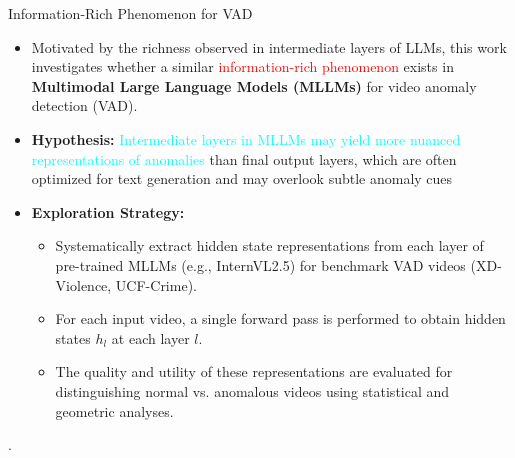 \documentclass[aspectratio=169,xcolor=dvipsnames]{beamer}
\begin{document}
	
	\begin{frame}{Information-Rich Phenomenon for VAD}
		\small
		\begin{itemize}
			\item 	Motivated by the richness observed in intermediate layers of LLMs, this work investigates whether a similar \textcolor{red}{information-rich phenomenon} exists in \textbf{Multimodal Large Language Models (MLLMs)} for video anomaly detection (VAD).
			\item \textbf{Hypothesis:} \textcolor{cyan}{Intermediate layers in MLLMs may yield more nuanced representations of anomalies} than final output layers, which are often optimized for text generation and may overlook subtle anomaly cues
			\item 	\textbf{Exploration Strategy:}
			\begin{itemize}
				\item Systematically extract hidden state representations from each layer of pre-trained MLLMs (e.g., InternVL2.5) for benchmark VAD videos (XD-Violence, UCF-Crime).
				\item For each input video, a single forward pass is performed to obtain hidden states $h_l$ at each layer $l$.
				\item The quality and utility of these representations are evaluated for distinguishing normal vs. anomalous videos using statistical and geometric analyses.
			\end{itemize}
		\end{itemize}
		
		
		
		
		
		
		
		.
	\end{frame}
	
\end{document}
